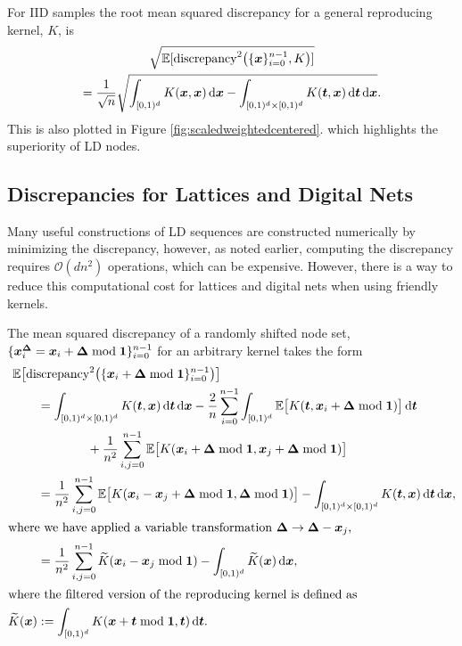 \documentclass{svproc}
\begin{document}
For IID samples the root mean squared discrepancy for a general reproducing kernel, $K$, is 
\begin{multline} \label{eq:discIID}
    \sqrt{\mathbb{E}[\text{discrepancy}^2\bigl(\{{\boldsymbol{x}}\}_{i=0}^{n-1},K \bigr)] } \\
    = \frac 1{\sqrt{n}}  \sqrt{  \int_{[0,1)^d} K({\boldsymbol{x}},{\boldsymbol{x}}) \, \mathrm{d} {\boldsymbol{x}} - 
	 \int_{[0,1)^d \times [0,1)^d} K({\boldsymbol{t}},{\boldsymbol{x}}) \, \mathrm{d} {\boldsymbol{t}} \, \mathrm{d} {\boldsymbol{x}}}.
\end{multline}
This is also plotted in Figure \ref{fig:scaledweightedcentered}. which highlights the superiority of LD nodes.

\subsection{Discrepancies for Lattices and Digital Nets} \label{sec:latticenetdis}
Many useful constructions of LD sequences are constructed numerically by minimizing the discrepancy, however, as noted earlier, computing the discrepancy requires $\mathcal{O}(dn^2)$ operations, which can be expensive.  However, there is a way to reduce this computational cost for lattices and digital nets when using friendly kernels.

The mean squared discrepancy of a randomly shifted node set, $\{{\boldsymbol{x}}_i^{{\boldsymbol{\Delta}}} =  {\boldsymbol{x}}_i + {\boldsymbol{\Delta}} \bmod {\boldsymbol{1}} \}_{i=0}^{n-1}$ for an arbitrary kernel takes the form
\begin{align}
\nonumber
\MoveEqLeft \mathbb{E}\bigl[\text{discrepancy}^2 \bigl (\{ \bsx_{i} + \bsDelta \bmod \bsone \}_{i=0}^{n-1} \bigr) \bigr] \\
\nonumber
& = \int_{[0,1)^d \times [0,1)^d} K(\bst,\bsx) \, \mathrm{d} \bst \, \mathrm{d} \bsx  -\frac 2n  \sum_{i=0}^{n-1}  \int_{[0,1)^d} \mathbb{E} \bigl [K(\bst,\bsx_i + \bsDelta \bmod \bsone) \bigr]  \, \mathrm{d} \bst \\
\nonumber
	& \qquad \qquad + \frac{1}{n^2} \sum_{i,j=0}^{n-1}  \mathbb{E} \bigl [ K(\bsx_i + \bsDelta \bmod \bsone,\bsx_j + \bsDelta \bmod \bsone) \bigr] \\
\nonumber
    & = \frac{1}{n^2} \sum_{i,j=0}^{n-1}  \mathbb{E} \bigl [ K(\bsx_i - \bsx_j  + \bsDelta \bmod \bsone, \bsDelta \bmod \bsone) \bigr] - \int_{[0,1)^d \times [0,1)^d} K(\bst,\bsx) \, \mathrm{d} \bst \, \mathrm{d} \bsx ,\\
    \intertext{where we have applied a variable transformation $\bsDelta \to \bsDelta - \bsx_j$,}
    & = \frac{1}{n^2} \sum_{i,j=0}^{n-1}  \widetilde{K}(\bsx_i - \bsx_j \bmod \bsone ) - \int_{[0,1)^d} \widetilde{K}(\bsx) \, \mathrm{d} \bsx, \\
    \intertext{where the filtered version of the reproducing kernel is defined as}
    \widetilde{K}(\bsx) &: = \int_{[0,1)^d} K(\bsx + \bst \bmod \bsone, \bst) \, \mathrm{d} \bst.
\end{align}
\end{document}
